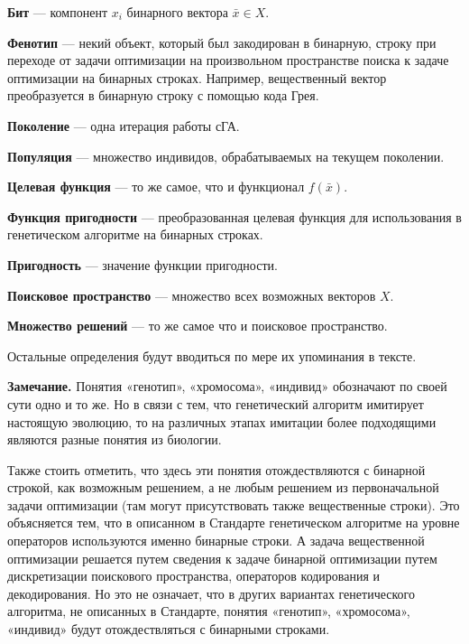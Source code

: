 \textbf{Бит} --- компонент $ x_i $ бинарного вектора $\bar{x}\in X$.

\textbf{Фенотип} --- некий объект, который был закодирован в бинарную, строку при переходе от задачи оптимизации на произвольном пространстве поиска к задаче оптимизации на бинарных строках. Например, вещественный вектор преобразуется в бинарную строку с помощью кода Грея.

\textbf{Поколение} --- одна итерация работы сГА.

\textbf{Популяция} --- множество индивидов, обрабатываемых на текущем поколении.

\textbf{Целевая функция} --- то же самое, что и функционал $ f\left( \bar{x}\right)  $.

\textbf{Функция пригодности} --- преобразованная целевая функция для использования в генетическом алгоритме на бинарных строках.

\textbf{Пригодность} --- значение функции пригодности.

\textbf{Поисковое пространство} --- множество всех возможных векторов $ X $.

\textbf{Множество решений} --- то же самое что и поисковое пространство.

Остальные определения будут вводиться по мере их упоминания в тексте.

\textbf{Замечание.} Понятия «генотип», «хромосома», «индивид» обозначают по своей сути одно и то же. Но в связи с тем, что генетический алгоритм имитирует настоящую эволюцию, то на различных этапах имитации более подходящими являются разные понятия из биологии.

Также стоить отметить, что здесь эти понятия отождествляются с бинарной строкой, как возможным решением, а не любым решением из первоначальной задачи оптимизации (там могут присутствовать также вещественные строки). Это объясняется тем, что в описанном в Стандарте генетическом алгоритме на уровне операторов используются именно бинарные строки. А задача вещественной оптимизации решается путем сведения к задаче бинарной оптимизации путем дискретизации поискового пространства, операторов кодирования и декодирования. Но это не означает, что в других вариантах генетического алгоритма, не описанных в Стандарте, понятия «генотип», «хромосома», «индивид» будут отождествляться с бинарными строками.

\clearpage